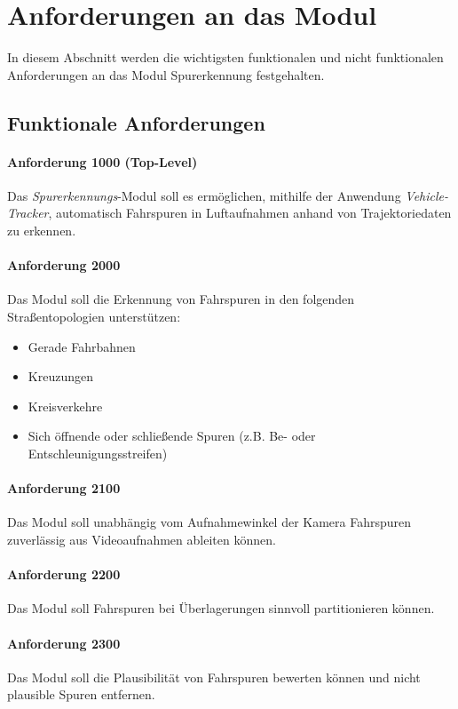 \section{Anforderungen an das Modul}
\label{sec:requirements}

In diesem Abschnitt werden die wichtigsten funktionalen und nicht funktionalen Anforderungen
an das Modul Spurerkennung festgehalten.

\subsection{Funktionale Anforderungen}

\paragraph{Anforderung 1000 (Top-Level)}
Das \textit{Spurerkennungs}-Modul soll es ermöglichen, mithilfe der Anwendung \textit{Vehicle-Tracker},
automatisch Fahrspuren in Luftaufnahmen anhand von Trajektoriedaten zu erkennen.

\paragraph{Anforderung 2000}
Das Modul soll die Erkennung von Fahrspuren in den folgenden Straßentopologien unterstützen:

\begin{itemize}
    \item Gerade Fahrbahnen
    \item Kreuzungen
    \item Kreisverkehre
    \item Sich öffnende oder schließende Spuren (z.B. Be- oder Entschleunigungsstreifen)
\end{itemize}

\paragraph{Anforderung 2100}
Das Modul soll unabhängig vom Aufnahmewinkel der Kamera Fahrspuren zuverlässig aus Videoaufnahmen ableiten können.

\paragraph{Anforderung 2200}
Das Modul soll Fahrspuren bei Überlagerungen sinnvoll partitionieren können.

\paragraph{Anforderung 2300}
Das Modul soll die Plausibilität von Fahrspuren bewerten können und nicht plausible Spuren entfernen.

